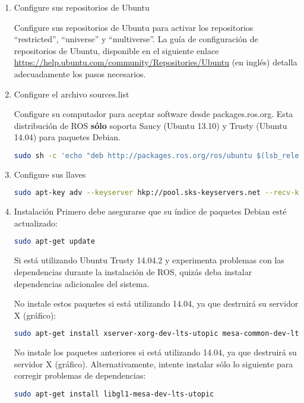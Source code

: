 \begin{enumerate}
\renewcommand{\labelenumii}{\theenumii}
\renewcommand{\theenumii}{\theenumi.\arabic{enumii}.}
	\item Configure sus repositorios de Ubuntu

	Configure sus repositorios de Ubuntu para activar los repositorios ``restricted'', ``universe'' y ``multiverse''. La guía de configuración de repositorios de Ubuntu, disponible en el siguiente enlace \url{https://help.ubuntu.com/community/Repositories/Ubuntu} (en inglés) detalla adecuadamente los pasos necesarios.
	\item Configure el archivo sources.list

	Configure su computador para aceptar software desde packages.ros.org. Esta distribución de ROS \textbf{sólo} soporta Saucy (Ubuntu 13.10) y Trusty (Ubuntu 14.04) para paquetes Debian.

	\begin{lstlisting}[language=bash]
sudo sh -c 'echo "deb http://packages.ros.org/ros/ubuntu $(lsb_release -sc) main" > /etc/apt/sources.list.d/ros-latest.list'
	\end{lstlisting}

	\item Configure sus llaves

	\begin{lstlisting}[language=bash]
sudo apt-key adv --keyserver hkp://pool.sks-keyservers.net --recv-key\\ 0xB01FA116
	\end{lstlisting}

	\item Instalación
	Primero debe asegurarse que su índice de paquetes Debian esté actualizado:

	\begin{lstlisting}[language=bash]
sudo apt-get update
	\end{lstlisting}

	Si está utilizando Ubuntu Trusty 14.04.2 y experimenta problemas con las dependencias durante la instalación de ROS, quizás deba instalar dependencias adicionales del sistema.

	\begin{myboxii}
	No instale estos paquetes si está utilizando 14.04, ya que destruirá su servidor X (gráfico):
	\end{myboxii}
	\begin{lstlisting}[language=bash]
sudo apt-get install xserver-xorg-dev-lts-utopic mesa-common-dev-lts-utopic libxatracker-dev-lts-utopic libopenvg1-mesa-dev-lts-utopic libgles2-mesa-dev-lts-utopic libgles1-mesa-dev-lts-utopic libgl1-mesa-dev-lts-utopic libgbm-dev-lts-utopic libegl1-mesa-dev-lts-utopic
	\end{lstlisting}
	\begin{myboxii}
	No instale los paquetes anteriores si está utilizando 14.04, ya que destruirá su servidor X (gráfico). Alternativamente, intente instalar sólo lo siguiente para corregir problemas de dependencias:
	\end{myboxii}
	\begin{lstlisting}[language=bash]
sudo apt-get install libgl1-mesa-dev-lts-utopic
	\end{lstlisting}


\end{enumerate}

